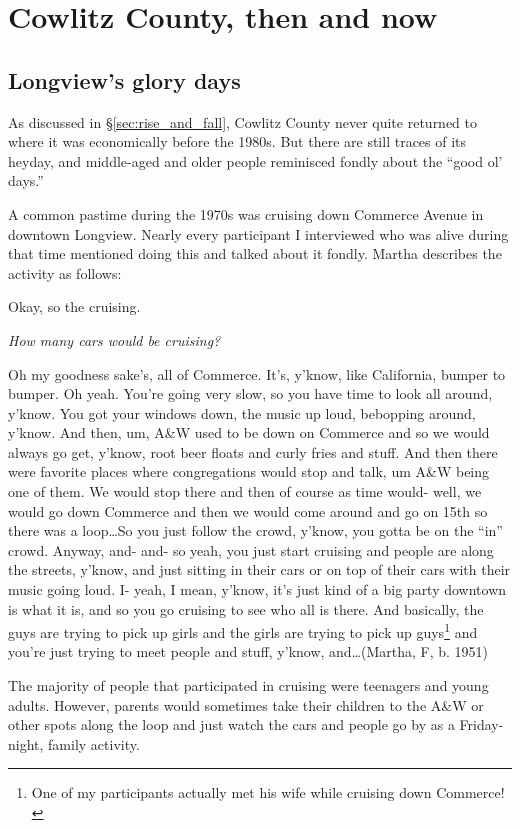 \section{Cowlitz County, then and now}
\label{sec:then_and_now}

\subsection{Longview's glory days}

As discussed in \S\ref{sec:rise_and_fall}, Cowlitz County never quite returned to where it was economically before the 1980s. But there are still traces of its heyday, and middle-aged and older people reminisced fondly about the ``good ol' days.''

A common pastime during the 1970s was cruising down Commerce Avenue in downtown Longview. Nearly every participant I interviewed who was alive during that time mentioned doing this and talked about it fondly. Martha describes the activity as follows:
\begin{num_quote}
    Okay, so the cruising.

    \textit{How many cars would be cruising?}

    Oh my goodness sake's, all of Commerce. It's, y'know, like California, bumper to bumper. Oh yeah. You're going very slow, so you have time to look all around, y'know. You got your windows down, the music up loud, bebopping around, y'know. And then, um, A\&W used to be down on Commerce and so we would always go get, y'know, root beer floats and curly fries and stuff. And then there were favorite places where congregations would stop and talk, um A\&W being one of them. We would stop there and then of course as time would- well, we would go down Commerce and then we would come around and go on 15th so there was a loop\ldots So you just follow the crowd, y'know, you gotta be on the ``in'' crowd. Anyway, and- and- so yeah, you just start cruising and people are along the streets, y'know, and just sitting in their cars or on top of their cars with their music going loud. I- yeah, I mean, y'know, it's just kind of a big party downtown is what it is, and so you go cruising to see who all is there. And basically, the guys are trying to pick up girls and the girls are trying to pick up guys\footnote{One of my participants actually met his wife while cruising down Commerce!} and you're just trying to meet people and stuff, y'know, and\ldots (Martha, F, b. 1951)
    \label{quote:cruising}
\end{num_quote}
The majority of people that participated in cruising were teenagers and young adults. However, parents would sometimes take their children to the A\&W or other spots along the loop and just watch the cars and people go by as a Friday-night, family activity.

